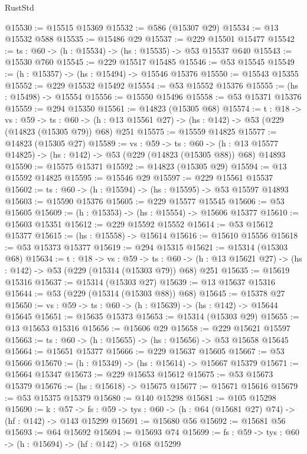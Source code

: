 \begin{lexlean}{RustStd}
\begin{coremodule}
@15530 := @15515 @15369
@15532 := @586 (@15307 @29)
@15534 := @13 @15532 @588
@15535 := @15486 @29
@15537 := @229 @15501 @15477
@15542 := {ts : @60} -> (h : @15534) -> (hs : @15535) -> @53 @15537 @640
@15543 := @15530 @760
@15545 := @229 @15517 @15485
@15546 := @53 @15545
@15549 := (h : @15357) -> (hs : @15494) -> @15546 @15376
@15550 := @15543 @15355
@15552 := @229 @15532 @15492
@15554 := @53 @15552 @15376
@15555 := (hs : @15498) -> @15554
@15556 := @15550 @15496
@15558 := @53 @15371 @15376
@15559 := @294 @15350
@15561 := @14823 (@15305 @68)
@15574 := {t : @18} ->
  {vs : @59} ->
  {ts : @60} -> (h : @13 @15561 @27) -> (hs : @142) -> @53 (@229 (@14823 (@15305 @79)) @68) @251
@15575 := @15559 @14825
@15577 := @14823 (@15305 @27)
@15589 := {vs : @59} ->
  {ts : @60} ->
  (h : @13 @15577 @14825) -> (hs : @142) -> @53 (@229 (@14823 (@15305 @88)) @68) @14893
@15590 := @15575 @15371
@15592 := @14823 (@15305 @29)
@15594 := @13 @15592 @14825
@15595 := @15546 @29
@15597 := @229 @15561 @15537
@15602 := {ts : @60} -> (h : @15594) -> (hs : @15595) -> @53 @15597 @14893
@15603 := @15590 @15376
@15605 := @229 @15577 @15545
@15606 := @53 @15605
@15609 := (h : @15353) -> (hs : @15554) -> @15606 @15377
@15610 := @15603 @15351
@15612 := @229 @15592 @15552
@15614 := @53 @15612 @15377
@15615 := (hs : @15558) -> @15614
@15616 := @15610 @15556
@15618 := @53 @15373 @15377
@15619 := @294 @15315
@15621 := @15314 (@15303 @68)
@15634 := {t : @18} ->
  {vs : @59} ->
  {ts : @60} -> (h : @13 @15621 @27) -> (hs : @142) -> @53 (@229 (@15314 (@15303 @79)) @68) @251
@15635 := @15619 @15316
@15637 := @15314 (@15303 @27)
@15639 := @13 @15637 @15316
@15644 := @53 (@229 (@15314 (@15303 @88)) @68)
@15645 := @15378 @27
@15650 := {vs : @59} -> {ts : @60} -> (h : @15639) -> (hs : @142) -> @15644 @15645
@15651 := @15635 @15373
@15653 := @15314 (@15303 @29)
@15655 := @13 @15653 @15316
@15656 := @15606 @29
@15658 := @229 @15621 @15597
@15663 := {ts : @60} -> (h : @15655) -> (hs : @15656) -> @53 @15658 @15645
@15664 := @15651 @15377
@15666 := @229 @15637 @15605
@15667 := @53 @15666
@15670 := (h : @15349) -> (hs : @15614) -> @15667 @15379
@15671 := @15664 @15347
@15673 := @229 @15653 @15612
@15675 := @53 @15673 @15379
@15676 := (hs : @15618) -> @15675
@15677 := @15671 @15616
@15679 := @53 @15375 @15379
@15680 := @140 @15298
@15681 := @105 @15298
@15690 := {k : @57} ->
  {fs : @59} -> {tys : @60} -> (h : @64 (@15681 @27) @74) -> (hf : @142) -> @143 @15299
@15691 := @15680 @56
@15692 := @15681 @56
@15693 := @64 @15692
@15694 := @15693 @74
@15699 := {fs : @59} -> {tys : @60} -> (h : @15694) -> (hf : @142) -> @168 @15299

\end{coremodule}
\end{lexlean}
